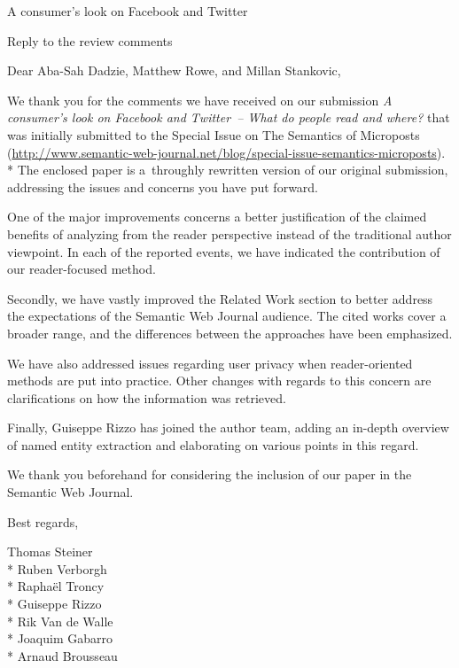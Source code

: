 \documentclass{letter}
\begin{document}
{\huge A consumer's look on Facebook and Twitter}

{\LARGE Reply to the review comments}

\vspace{5em}

Dear Aba-Sah Dadzie, Matthew Rowe, and Millan Stankovic,

We thank you for the comments we have received on our submission \emph{A consumer's look on Facebook and Twitter~-- What do people read and where?} that was initially submitted to the Special Issue on The Semantics of Microposts (\url{http://www.semantic-web-journal.net/blog/special-issue-semantics-microposts}).
\\*
The enclosed paper is a~throughly rewritten version of our original submission,
addressing the issues and concerns you have put forward.

One of the major improvements concerns a better justification of the claimed benefits of analyzing from the reader perspective instead of the traditional author viewpoint.
In each of the reported events, we have indicated the contribution of our reader-focused method.

Secondly, we have vastly improved the Related Work section to better address the expectations of the Semantic Web Journal audience.
The cited works cover a broader range, and the differences between the approaches have been emphasized.

We have also addressed issues regarding user privacy when reader-oriented methods are put into practice.
Other changes with regards to this concern are clarifications on how the information was retrieved.

Finally, Guiseppe Rizzo has joined the author team, adding an in-depth overview of named entity extraction and elaborating on various points in this regard.

We thank you beforehand for considering the inclusion of our paper in the Semantic Web Journal.

Best regards,

Thomas Steiner\\*
Ruben Verborgh\\*
Raphaël Troncy\\*
Guiseppe Rizzo\\*
Rik Van de Walle\\*
Joaquim Gabarro\\*
Arnaud Brousseau
\end{document}
